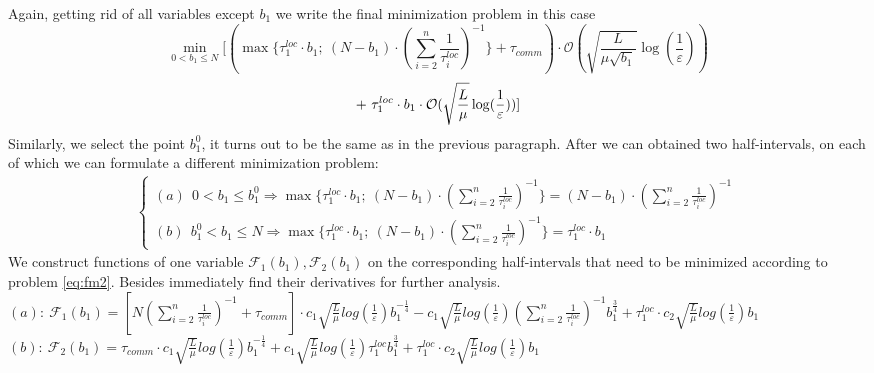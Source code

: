 \documentclass{article}
\begin{document}
Again, getting rid of all variables except $b_1$ we write the final minimization problem in this case
\begin{equation}
    \label{eq:fm2}
      \underset{0 < b_1 \leq N}{\min}[(\max\{\tau_1^{loc}\cdot b_1; ~(N-b_1) \cdot (\sum\limits_{i = 2}^{n} \frac{1}{\tau_i^{loc}} )^{-1}\} + \tau_{comm}) \cdot \mathcal O(\sqrt{\frac{L}{\mu \sqrt{b_1}}}\log(\frac{1}{\varepsilon}))
\end{equation}
\begin{equation}
     \notag
     + ~
    \tau_1^{loc}\cdot b_1 \cdot \mathcal O(\sqrt{\frac{L}{\mu}}\log(\frac{1}{\varepsilon}))] 
\end{equation}
Similarly, we select the point $b_1^0$, it turns out to be the same as in the previous paragraph. After we can obtained two half-intervals, on each of which we can formulate a different minimization problem:
\begin{eqnarray}
\label{half-int}
    \begin{cases}
    (a) ~ ~ 0 < b_1 \leq b_1^0 \Rightarrow \max\{\tau_1^{loc}\cdot b_1; ~(N-b_1) \cdot (\sum\limits_{i = 2}^{n} \frac{1}{\tau_i^{loc}} )^{-1}\} = 
    (N-b_1) \cdot (\sum\limits_{i = 2}^{n} \frac{1}{\tau_i^{loc}})^{-1}
    \\
    (b) ~ ~ b_1^0 <  b_1 \leq N \Rightarrow \max\{\tau_1^{loc}\cdot b_1; ~(N-b_1) \cdot (\sum\limits_{i = 2}^{n} \frac{1}{\tau_i^{loc}} )^{-1}\} = \tau_1^{loc}\cdot b_1
    \end{cases}\,
\end{eqnarray}
We construct functions of one variable $\mathcal{F}_1(b_1), \mathcal{F}_2(b_1)$ on the corresponding half-intervals that need to be minimized according to problem \eqref{eq:fm2}. Besides immediately find their derivatives for further analysis.\\
$(a): ~\mathcal{F}_1(b_1) = [N (\sum\limits_{i = 2}^{n} \frac{1}{\tau_i^{loc}})^{-1} + \tau_{comm}]\cdot 
c_1 \sqrt{\frac{L}{\mu}}log (\frac{1}{\varepsilon})  b_1^{-\frac{1}{4}} - 
c_1  \sqrt{\frac{L}{\mu}}log (\frac{1}{\varepsilon})(\sum\limits_{i =
2}^{n} \frac{1}{\tau_i^{loc}})^{-1} b_1^{\frac{3}{4}}  + \tau_1^{loc}\cdot c_2  \sqrt{\frac{L}{\mu}}log (\frac{1}{\varepsilon}) b_1 $\\
$(b): ~\mathcal{F}_2(b_1) = \tau_{comm}\cdot 
c_1 \sqrt{\frac{L}{\mu}}log (\frac{1}{\varepsilon})  b_1^{-\frac{1}{4}} + 
c_1  \sqrt{\frac{L}{\mu}}log (\frac{1}{\varepsilon})\tau_1^{loc} b_1^{\frac{3}{4}}  + \tau_1^{loc}\cdot c_2  \sqrt{\frac{L}{\mu}}log (\frac{1}{\varepsilon}) b_1 $
\\
\end{document}
